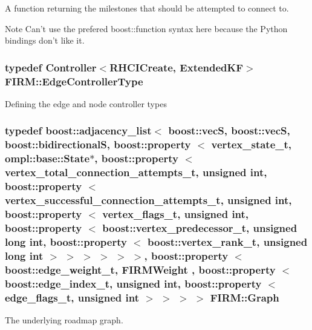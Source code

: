 \-A function returning the milestones that should be attempted to connect to. 

\begin{DoxyNote}{\-Note}
\-Can't use the prefered boost\-::function syntax here because the \-Python bindings don't like it. 
\end{DoxyNote}
\hypertarget{class_f_i_r_m_a70abcb24fbc9f836b94119f65c8f8a37}{
\subsubsection[{\-Edge\-Controller\-Type}]{\setlength{\rightskip}{0pt plus 5cm}typedef {\bf \-Controller}$<${\bf \-R\-H\-C\-I\-Create}, {\bf \-Extended\-K\-F}$>$ {\bf \-F\-I\-R\-M\-::\-Edge\-Controller\-Type}}}\label{class_f_i_r_m_a70abcb24fbc9f836b94119f65c8f8a37}
\-Defining the edge and node controller types \hypertarget{class_f_i_r_m_a687e9f4243b22c30ee1fa5da22a85053}{
\subsubsection[{\-Graph}]{\setlength{\rightskip}{0pt plus 5cm}typedef boost\-::adjacency\-\_\-list$<$ boost\-::vec\-S, boost\-::vec\-S, boost\-::bidirectional\-S, boost\-::property $<$ {\bf vertex\-\_\-state\-\_\-t}, ompl\-::base\-::\-State$\ast$, boost\-::property $<$ {\bf vertex\-\_\-total\-\_\-connection\-\_\-attempts\-\_\-t}, unsigned int, boost\-::property $<$ {\bf vertex\-\_\-successful\-\_\-connection\-\_\-attempts\-\_\-t}, unsigned int, boost\-::property $<$ {\bf vertex\-\_\-flags\-\_\-t}, unsigned int, boost\-::property $<$ boost\-::vertex\-\_\-predecessor\-\_\-t, unsigned long int, boost\-::property $<$ boost\-::vertex\-\_\-rank\-\_\-t, unsigned long int $>$ $>$ $>$ $>$ $>$ $>$, boost\-::property $<$ boost\-::edge\-\_\-weight\-\_\-t, {\bf \-F\-I\-R\-M\-Weight} , boost\-::property $<$ boost\-::edge\-\_\-index\-\_\-t, unsigned int, boost\-::property $<$ {\bf edge\-\_\-flags\-\_\-t}, unsigned int $>$ $>$ $>$ $>$ {\bf \-F\-I\-R\-M\-::\-Graph}}}\label{class_f_i_r_m_a687e9f4243b22c30ee1fa5da22a85053}


\-The underlying roadmap graph. 

